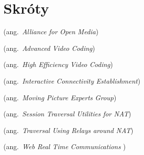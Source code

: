 % 
\chapter*{Skróty}
\label{sec:skroty}
\noindent\vspace{-\topsep-\partopsep-\parsep} %
\begin{description}[labelwidth=*]
  \item [AOM] (ang.\ \emph{Alliance for Open Media})
  \item [AVC] (ang.\ \emph{Advanced Video Coding})
  \item [HEVC] (ang.\ \emph{High Efficiency Video Coding})
  \item [ICE] (ang.\ \emph{Interactive Connectivity Establishment})
  \item [MPEG] (ang.\ \emph{Moving Picture Experts Group})
  \item [STUN] (ang.\ \emph{Session Traversal Utilities for NAT})
  \item [TURN] (ang.\ \emph{Traversal Using Relays around NAT})
  \item [WebRTC] (ang.\ \emph{Web Real Time Communications })
\end{description}
